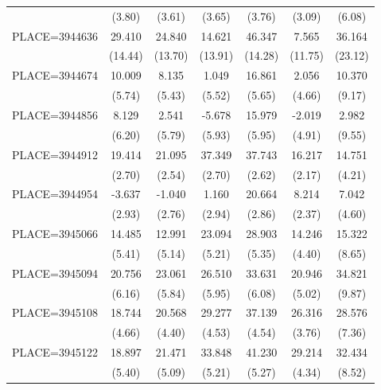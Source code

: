 {\begin{tabular}{l*{6}{c}}
                    &      (3.80)&      (3.61)&      (3.65)&      (3.76)&      (3.09)&      (6.08)\\
PLACE=3944636       &      29.410&      24.840&      14.621&      46.347&       7.565&      36.164\\
                    &     (14.44)&     (13.70)&     (13.91)&     (14.28)&     (11.75)&     (23.12)\\
PLACE=3944674       &      10.009&       8.135&       1.049&      16.861&       2.056&      10.370\\
                    &      (5.74)&      (5.43)&      (5.52)&      (5.65)&      (4.66)&      (9.17)\\
PLACE=3944856       &       8.129&       2.541&      -5.678&      15.979&      -2.019&       2.982\\
                    &      (6.20)&      (5.79)&      (5.93)&      (5.95)&      (4.91)&      (9.55)\\
PLACE=3944912       &      19.414&      21.095&      37.349&      37.743&      16.217&      14.751\\
                    &      (2.70)&      (2.54)&      (2.70)&      (2.62)&      (2.17)&      (4.21)\\
PLACE=3944954       &      -3.637&      -1.040&       1.160&      20.664&       8.214&       7.042\\
                    &      (2.93)&      (2.76)&      (2.94)&      (2.86)&      (2.37)&      (4.60)\\
PLACE=3945066       &      14.485&      12.991&      23.094&      28.903&      14.246&      15.322\\
                    &      (5.41)&      (5.14)&      (5.21)&      (5.35)&      (4.40)&      (8.65)\\
PLACE=3945094       &      20.756&      23.061&      26.510&      33.631&      20.946&      34.821\\
                    &      (6.16)&      (5.84)&      (5.95)&      (6.08)&      (5.02)&      (9.87)\\
PLACE=3945108       &      18.744&      20.568&      29.277&      37.139&      26.316&      28.576\\
                    &      (4.66)&      (4.40)&      (4.53)&      (4.54)&      (3.76)&      (7.36)\\
PLACE=3945122       &      18.897&      21.471&      33.848&      41.230&      29.214&      32.434\\
                    &      (5.40)&      (5.09)&      (5.21)&      (5.27)&      (4.34)&      (8.52)\\

\end{tabular}}

